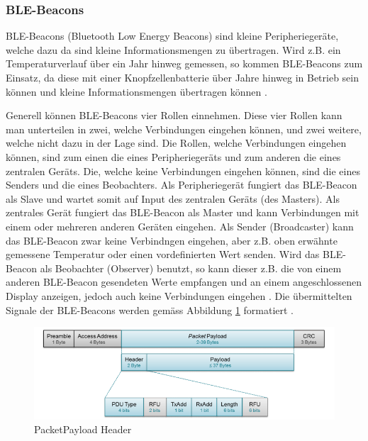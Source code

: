 \subsubsection{BLE-Beacons}
BLE-Beacons (Bluetooth Low Energy Beacons) sind kleine Peripheriegeräte, welche dazu da sind kleine Informationsmengen zu übertragen. Wird z.B. ein Temperaturverlauf über ein Jahr hinweg gemessen, so kommen BLE-Beacons zum Einsatz, da diese mit einer Knopfzellenbatterie über Jahre hinweg in Betrieb sein können und kleine Informationsmengen übertragen können \cite{9_Teildokument_BT}.

Generell können BLE-Beacons vier Rollen einnehmen. Diese vier Rollen kann man unterteilen in zwei, welche Verbindungen eingehen können, und zwei weitere, welche nicht dazu in der Lage sind. Die Rollen, welche Verbindungen eingehen können, sind zum einen die eines Peripheriegeräts und zum anderen die eines zentralen Geräts. Die, welche keine Verbindungen eingehen können, sind die eines Senders und die eines Beobachters. Als Peripheriegerät fungiert das BLE-Beacon als Slave und wartet somit auf Input des zentralen Geräts (des Masters). Als zentrales Gerät fungiert das BLE-Beacon als Master und kann Verbindungen mit einem oder mehreren anderen Geräten eingehen. Als Sender (Broadcaster) kann das BLE-Beacon zwar keine Verbindngen eingehen, aber z.B. oben erwähnte gemessene Temperatur oder einen vordefinierten Wert senden. Wird das BLE-Beacon als Beobachter (Observer) benutzt, so kann dieser z.B. die von einem anderen BLE-Beacon gesendeten Werte empfangen und an einem angeschlossenen Display anzeigen, jedoch auch keine Verbindungen eingehen \cite{9_Teildokument_BT}. Die übermittelten Signale der BLE-Beacons werden gemäss Abbildung \ref{fig:PacketPayload_Header} formatiert \cite{9_Teildokument_BT}.

\begin{figure}[htbp!!!!]
	\begin{center}
		\includegraphics[width=\textwidth]{data/PacketPayload_Header.png}
		\caption[PacketPayload Header]{PacketPayload Header \cite{9_Teildokument_BT}} %
		\label{fig:PacketPayload_Header}
	\end{center}
\end{figure}

